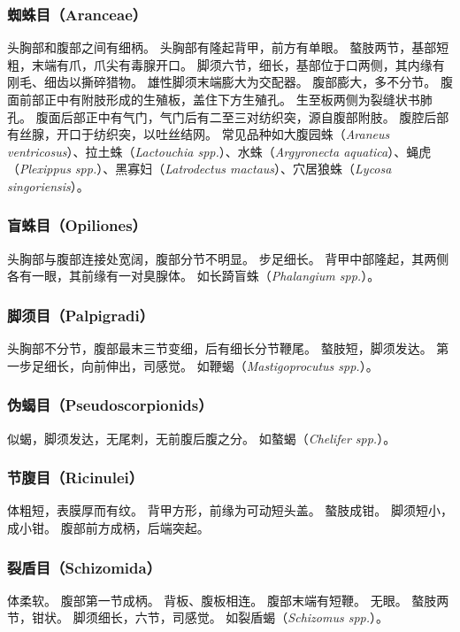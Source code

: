 \documentclass[11pt]{article}
\begin{document}
\subsubsection{蜘蛛目（Aranceae）}
头胸部和腹部之间有细柄。
头胸部有隆起背甲，前方有单眼。
螯肢两节，基部短粗，末端有爪，爪尖有毒腺开口。
脚须六节，细长，基部位于口两侧，其内缘有刚毛、细齿以撕碎猎物。
雄性脚须末端膨大为交配器。
腹部膨大，多不分节。
腹面前部正中有附肢形成的生殖板，盖住下方生殖孔。
生至板两侧为裂缝状书肺孔。
腹面后部正中有气门，气门后有二至三对纺织突，源自腹部附肢。
腹腔后部有丝腺，开口于纺织突，以吐丝结网。
常见品种如大腹园蛛（\textit{Araneus ventricosus}）、拉土蛛（\textit{Lactouchia spp.}）、水蛛（\textit{Argyronecta aquatica}）、蝇虎（\textit{Plexippus spp.}）、黑寡妇（\textit{Latrodectus mactaus}）、穴居狼蛛（\textit{Lycosa singoriensis}）。

\subsubsection{盲蛛目（Opiliones）}
头胸部与腹部连接处宽阔，腹部分节不明显。
步足细长。
背甲中部隆起，其两侧各有一眼，其前缘有一对臭腺体。
如长踦盲蛛（\textit{Phalangium spp.}）。

\subsubsection{脚须目（Palpigradi）}
头胸部不分节，腹部最末三节变细，后有细长分节鞭尾。
螯肢短，脚须发达。
第一步足细长，向前伸出，司感觉。
如鞭蝎（\textit{Mastigoprocutus spp.}）。

\subsubsection{伪蝎目（Pseudoscorpionids）}
似蝎，脚须发达，无尾刺，无前腹后腹之分。
如螯蝎（\textit{Chelifer spp.}）。

\subsubsection{节腹目（Ricinulei）}
体粗短，表膜厚而有纹。
背甲方形，前缘为可动短头盖。
螯肢成钳。
脚须短小，成小钳。
腹部前方成柄，后端突起。

\subsubsection{裂盾目（Schizomida）}
体柔软。
腹部第一节成柄。
背板、腹板相连。
腹部末端有短鞭。
无眼。
螯肢两节，钳状。
脚须细长，六节，司感觉。
如裂盾蝎（\textit{Schizomus spp.}）。
\end{document}
